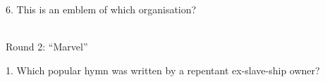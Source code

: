 \begin{frame}
\begin{center}
\Large
6. This is an emblem of which organisation?
\\
\\
\end{center}
\end{frame}
\begin{frame}

\end{frame}
\begin{frame}
\begin{center}
\Huge
Round 2: ``Marvel''
\end{center}
\end{frame}
\begin{frame}
\begin{center}
\Large
1. Which popular hymn was written by a repentant ex-slave-ship owner?
\end{center}
\end{frame}
